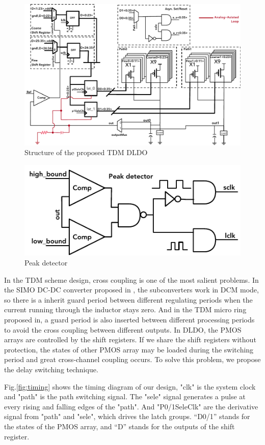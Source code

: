 \documentclass[draftcls, journal]{IEEEtran}
\begin{document}
\begin{figure}[t!]
    \centering
    \includegraphics{pic/struc/sche.pdf}
    \caption{Structure of the proposed TDM DLDO}
    \label{fig:diag}
\end{figure}
\begin{figure}[t!]
    \centering
    \includegraphics[width=0.7\linewidth]{pic/struc/peak.pdf}
    \caption{Peak detector}
    \label{fig:peak}
\end{figure}
In the TDM scheme design, cross coupling is one of the most salient problems. In the SIMO DC-DC converter proposed in \cite{SIMODCDC}, the subconverters work in DCM mode, so there is a inherit guard period  between different regulating periods when the current running through the inductor stays zero. And in the TDM micro ring proposed in\cite{wangzhicheng}, a guard period is also inserted between different processing periods to avoid the cross coupling between different outputs. In DLDO, the PMOS arrays are controlled by the shift registers. If we share the shift registers without protection, the states of other PMOS array may be loaded during the switching period and great cross-channel coupling occurs. To solve this problem, we propose the delay switching technique.

Fig.\ref{fig:timing} shows the timing diagram of our design, "clk" is the system clock and "path" is the path switching signal. The "sele" signal generates a pulse at every rising and falling edges of the "path". And "P0/1SeleClk" are the derivative signal from "path" and "sele", which drives the latch groups. “D0/1” stands for the states of the PMOS array, and “D” stands for the outputs of the shift register. 
\end{document}
